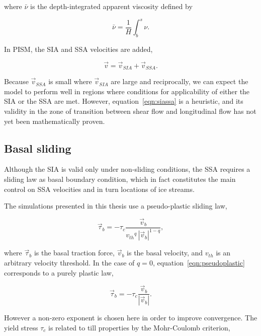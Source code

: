 \documentclass{article}
\begin{document}
where $\bar{\nu}$ is the depth-integrated apparent viscosity defined by

\begin{equation}
    \bar{\nu} = \frac{1}{H}\int_b^s\nu.
\end{equation}

In PISM, the SIA and SSA velocities are added,

\begin{equation}
    \label{eqn:siassa}
    \vec{v} = \vec{v}_{SIA} + \vec{v}_{SSA}.
\end{equation}

Because $\vec{v}_{SSA}$ is small where $\vec{v}_{SIA}$ are large and
reciprocally, we can expect the model to perform well in regions where
conditions for applicability of either the SIA or the SSA are met. However,
equation~\ref{eqn:siassa} is a heuristic, and its validity in the zone of
transition between shear flow and longitudinal flow has not yet been
mathematically proven.

\subsection{Basal sliding}

Although the SIA is valid only under non-sliding conditions, the SSA requires
a sliding law as basal boundary condition, which in fact constitutes the main
control on SSA velocities and in turn locations of ice streams.

The simulations presented in this thesis use a pseudo-plastic sliding law,

\begin{equation}
    \label{eqn:pseudoplastic}
    \vec{\tau}_b = -\tau_c \frac{\vec{v}_b}{{v_{th}}^q\,|\vec{v}_b|^{1-q}},
\end{equation}

where $\vec{\tau}_b$ is the basal traction force, $\vec{v}_b$ is the basal
velocity, and $v_{th}$ is an arbitrary velocity threshold. In the case of
$q=0$, equation~\ref{eqn:pseudoplastic} corresponds to a purely plastic law,

\begin{equation}
    \label{eqn:plastic}
    \vec{\tau}_b = -\tau_c \frac{\vec{v}_b}{|\vec{v}_b|}.
\end{equation}

However a non-zero exponent is chosen here in order to improve convergence. The
yield stress $\tau_c$ is related to till properties by the Mohr-Coulomb
criterion,
\end{document}
